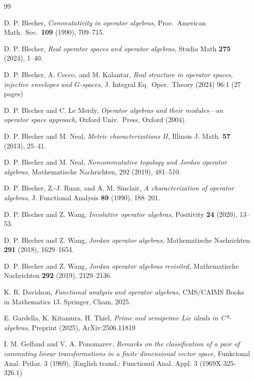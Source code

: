 \documentclass{amsart}
\theoremstyle{remark}
\theoremstyle{definition}
\numberwithin{equation}{section}
\begin{document}
\begin{thebibliography}{99} 

  D. P. Blecher, {\em Commutativity in operator algebras,} Proc.\  American Math.\ Soc.\ {\bf 109} (1990), 709--715.


 D. P. Blecher, {\em Real operator spaces and operator algebras,} Studia Math {\bf 275} (2024), 1--40.



 D. P. Blecher, A. Cecco, and M. Kalantar, {\em Real structure in operator spaces, injective envelopes and $G$-spaces,} J. Integral Eq.\ Oper.\ Theory (2024) 96:1 (27 pages) 


  D. P. Blecher and C.  Le Merdy, {\em Operator algebras and their modules---an
operator space approach,} Oxford Univ.\  Press, Oxford (2004).


 D. P. Blecher and  M. Neal, {\em Metric characterizations II, } Illinois J. Math. {\bf 57} (2013), 25--41.

 D. P. Blecher and  M. Neal, {\em Noncommutative topology and Jordan operator algebras,}  Mathematische Nachrichten, 292 (2019), 481--510. 

 D. P. Blecher, Z.-J. Ruan, and A. M. Sinclair, {\em A characterization of operator algebras,} J. Functional  Analysis {\bf 89} (1990), 188--201.

 D. P. Blecher and Z. Wang, {\em Involutive operator algebras,}  Positivity {\bf 24} (2020), 13--53.

 D. P. Blecher and Z. Wang, {\em
Jordan operator algebras,} Mathematische Nachrichten {\bf 291} (2018), 1629--1654.

 D. P. Blecher and Z. Wang, {\em
Jordan operator algebras revisited,}  Mathematische Nachrichten {\bf 292} (2019), 2129--2136.

 K. R. Davidson, {\em Functional analysis and operator algebras,} CMS/CAIMS Books in Mathematics
13. Springer, Cham, 2025.


  E. Gardella, K. Kitamura, H.  Thiel, {\em  
Prime and semiprime Lie ideals in C*-algebras,}
Preprint (2025), ArXiv:2506.11819


  I. M. Gelfand and V. A. Ponomarev, {\em Remarks on the classification of a pair of commuting
linear transformations in a finite dimensional vector space,} Funkcional Anal. Priloz. 3
(1969), [English transl.: Functionul Anal. Appl. 3 (1969X 325-326.1) 




\end{thebibliography}
\end{document}
